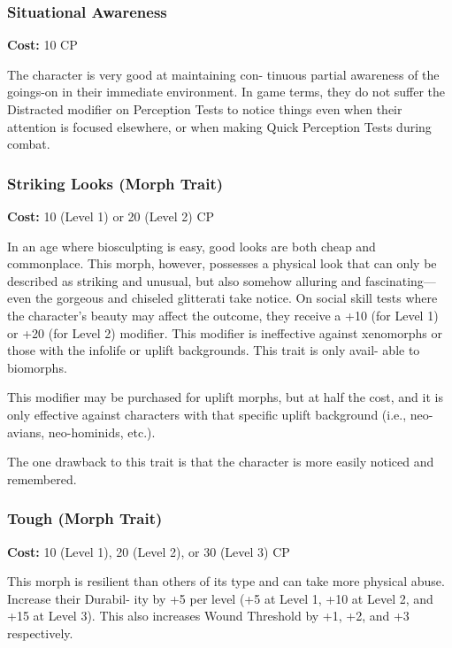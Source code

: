 \subsubsection{Situational Awareness}

\textbf{Cost:} 10 CP

The character is very good at maintaining con-
tinuous partial awareness of the goings-on in their 
immediate environment. In game terms, they do not 
suffer the Distracted modifier on Perception Tests 
to notice things even when their attention is focused 
elsewhere, or when making Quick Perception Tests 
during combat.

\subsubsection{Striking Looks (Morph Trait)}

\textbf{Cost:} 10 (Level 1) or 20 (Level 2) CP

In an age where biosculpting is easy, good looks are 
both cheap and commonplace. This morph, however, 
possesses a physical look that can only be described as 
striking and unusual, but also somehow alluring and 
fascinating—even the gorgeous and chiseled glitterati 
take notice. On social skill tests where the character's 
beauty may affect the outcome, they receive a +10 (for 
Level 1) or +20 (for Level 2) modifier. This modifier 
is ineffective against xenomorphs or those with the 
infolife or uplift backgrounds. This trait is only avail-
able to biomorphs.

This modifier may be purchased for uplift morphs, 
but at half the cost, and it is only effective against 
characters with that specific uplift background (i.e., 
neo-avians, neo-hominids, etc.).

The one drawback to this trait is that the character 
is more easily noticed and remembered.

\subsubsection{Tough (Morph Trait)}

\textbf{Cost:} 10 (Level 1), 20 (Level 2), or 30 (Level 3) CP

This morph is resilient than others of its type and 
can take more physical abuse. Increase their Durabil-
ity by +5 per level (+5 at Level 1, +10 at Level 2, and 
+15 at Level 3). This also increases Wound Threshold 
by +1, +2, and +3 respectively.

